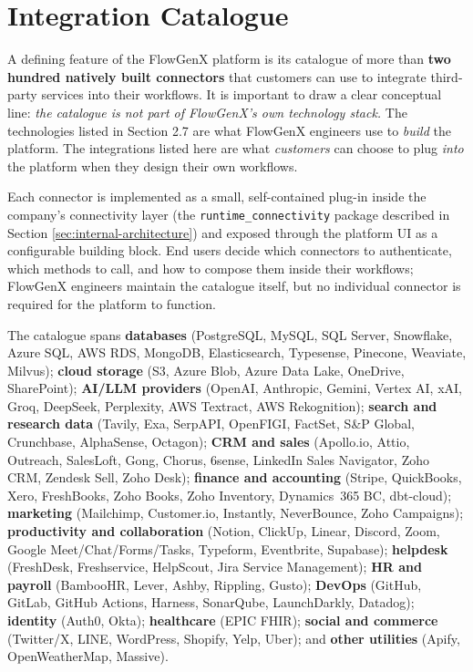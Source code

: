\section{Integration Catalogue}
\label{sec:integration-catalogue}

A defining feature of the FlowGenX platform is its catalogue of more
than \textbf{two hundred natively built connectors} that customers
can use to integrate third-party services into their workflows. It
is important to draw a clear conceptual line: \emph{the catalogue is
not part of FlowGenX's own technology stack.} The technologies
listed in Section 2.7 are what FlowGenX engineers use to
\emph{build} the platform. The integrations listed here are what
\emph{customers} can choose to plug \emph{into} the platform when
they design their own workflows.

Each connector is implemented as a small, self-contained
plug-in inside the company's connectivity layer (the
\texttt{runtime\_connectivity} package described in Section
\ref{sec:internal-architecture}) and exposed through the platform UI
as a configurable building block. End users decide which connectors
to authenticate, which methods to call, and how to compose them
inside their workflows; FlowGenX engineers maintain the catalogue
itself, but no individual connector is required for the platform to
function.

The catalogue spans \textbf{databases} (PostgreSQL, MySQL, SQL
Server, Snowflake, Azure SQL, AWS RDS, MongoDB, Elasticsearch,
Typesense, Pinecone, Weaviate, Milvus); \textbf{cloud storage}
(S3, Azure Blob, Azure Data Lake, OneDrive, SharePoint);
\textbf{AI/LLM providers} (OpenAI, Anthropic, Gemini, Vertex AI,
xAI, Groq, DeepSeek, Perplexity, AWS Textract, AWS Rekognition);
\textbf{search and research data} (Tavily, Exa, SerpAPI, OpenFIGI,
FactSet, S\&P Global, Crunchbase, AlphaSense, Octagon);
\textbf{CRM and sales} (Apollo.io, Attio, Outreach, SalesLoft, Gong,
Chorus, 6sense, LinkedIn Sales Navigator, Zoho CRM, Zendesk Sell,
Zoho Desk); \textbf{finance and accounting} (Stripe, QuickBooks,
Xero, FreshBooks, Zoho Books, Zoho Inventory, Dynamics~365 BC,
dbt-cloud); \textbf{marketing} (Mailchimp, Customer.io, Instantly,
NeverBounce, Zoho Campaigns); \textbf{productivity and
collaboration} (Notion, ClickUp, Linear, Discord, Zoom, Google
Meet/Chat/Forms/Tasks, Typeform, Eventbrite, Supabase);
\textbf{helpdesk} (FreshDesk, Freshservice, HelpScout, Jira Service
Management); \textbf{HR and payroll} (BambooHR, Lever, Ashby,
Rippling, Gusto); \textbf{DevOps} (GitHub, GitLab, GitHub Actions,
Harness, SonarQube, LaunchDarkly, Datadog); \textbf{identity}
(Auth0, Okta); \textbf{healthcare} (EPIC FHIR); \textbf{social and
commerce} (Twitter/X, LINE, WordPress, Shopify, Yelp, Uber); and
\textbf{other utilities} (Apify, OpenWeatherMap, Massive).

